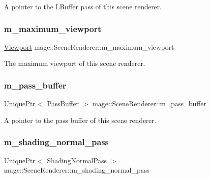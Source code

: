 A pointer to the L\+Buffer pass of this scene renderer. \hypertarget{classmage_1_1_scene_renderer_aee59ce6095e555d2692dfbb6dbeec206}{}\label{classmage_1_1_scene_renderer_aee59ce6095e555d2692dfbb6dbeec206} 
\subsubsection{\texorpdfstring{m\+\_\+maximum\+\_\+viewport}{m\_maximum\_viewport}}
{\footnotesize\ttfamily \hyperlink{structmage_1_1_viewport}{Viewport} mage\+::\+Scene\+Renderer\+::m\+\_\+maximum\+\_\+viewport\hspace{0.3cm}{\ttfamily [private]}}

The maximum viewport of this scene renderer. \hypertarget{classmage_1_1_scene_renderer_a9801d415ee0113f9d2a53802df0cb7ba}{}\label{classmage_1_1_scene_renderer_a9801d415ee0113f9d2a53802df0cb7ba} 
\subsubsection{\texorpdfstring{m\+\_\+pass\+\_\+buffer}{m\_pass\_buffer}}
{\footnotesize\ttfamily \hyperlink{namespacemage_a3316d7143a973e37adf1110f2e80ca31}{Unique\+Ptr}$<$ \hyperlink{structmage_1_1_pass_buffer}{Pass\+Buffer} $>$ mage\+::\+Scene\+Renderer\+::m\+\_\+pass\+\_\+buffer\hspace{0.3cm}{\ttfamily [private]}}

A pointer to the pass buffer of this scene renderer. \hypertarget{classmage_1_1_scene_renderer_a183c95ded274991bc80dccd8a373cce5}{}\label{classmage_1_1_scene_renderer_a183c95ded274991bc80dccd8a373cce5} 
\subsubsection{\texorpdfstring{m\+\_\+shading\+\_\+normal\+\_\+pass}{m\_shading\_normal\_pass}}
{\footnotesize\ttfamily \hyperlink{namespacemage_a3316d7143a973e37adf1110f2e80ca31}{Unique\+Ptr}$<$ \hyperlink{classmage_1_1_shading_normal_pass}{Shading\+Normal\+Pass} $>$ mage\+::\+Scene\+Renderer\+::m\+\_\+shading\+\_\+normal\+\_\+pass\hspace{0.3cm}{\ttfamily [private]}}

